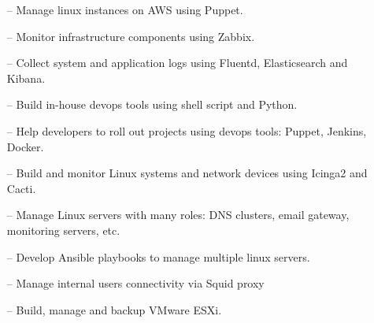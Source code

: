 \documentclass[8pt,a4paper, withhyper]{altacv}
\begin{document}
\begin{paracol}{2}
\divider

\begin{itemize}
\item[--] Manage linux instances on AWS using Puppet.
\item[--] Monitor infrastructure components using Zabbix.
\item[--] Collect system and application logs using Fluentd, Elasticsearch and Kibana.
\item[--] Build in-house devops tools using shell script and Python.
\item[--] Help developers to roll out projects using devops tools: Puppet, Jenkins, Docker.
\end{itemize}

\divider

\begin{itemize}
\item[--] Build and monitor Linux systems and network devices using Icinga2 and Cacti.
\item[--] Manage Linux servers with many roles: DNS clusters, email gateway, monitoring servers, etc.
\item[--] Develop Ansible playbooks to manage multiple linux servers.
\item[--] Manage internal users connectivity via Squid proxy
\item[--] Build, manage and backup VMware ESXi.
\end{itemize}


\switchcolumn



\divider\smallskip


\divider\smallskip


\divider\smallskip



\end{paracol}
\end{document}
